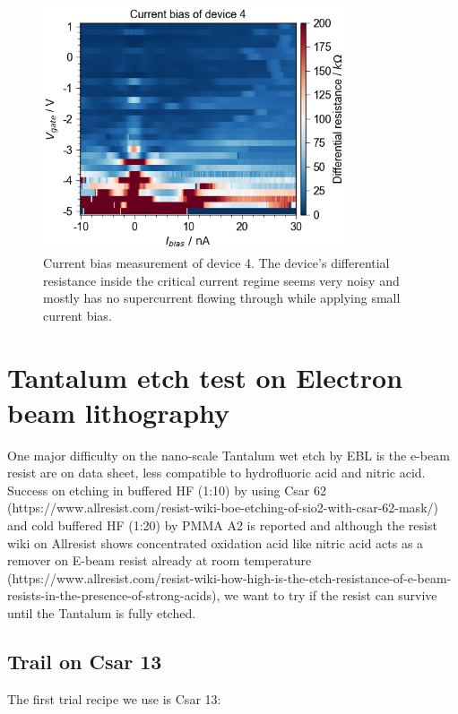 \begin{figure}[h!]
    \centering
    \includegraphics[width=0.8\textwidth]{Pic/D4_Ibias.png}
    \caption{Current bias measurement of device 4. The device's differential resistance inside the critical current regime seems very noisy and mostly has no supercurrent flowing through while applying small current bias.}
    \label{fig:my_label}
\end{figure}

\chapter{Tantalum etch test on Electron beam lithography}

One major difficulty on the nano-scale Tantalum wet etch by EBL is the e-beam resist are on data sheet, less compatible to hydrofluoric acid and nitric acid. Success on etching in buffered HF (1:10) by using Csar 62 (https://www.allresist.com/resist-wiki-boe-etching-of-sio2-with-csar-62-mask/) and cold buffered HF (1:20) by PMMA A2 is reported and although the resist wiki on Allresist shows concentrated oxidation acid like nitric acid acts as a remover on E-beam resist already at room temperature (https://www.allresist.com/resist-wiki-how-high-is-the-etch-resistance-of-e-beam-resists-in-the-presence-of-strong-acids), we want to try if the resist can survive until the Tantalum is fully etched.
\section{Trail on Csar 13}
The first trial recipe we use is Csar 13:

